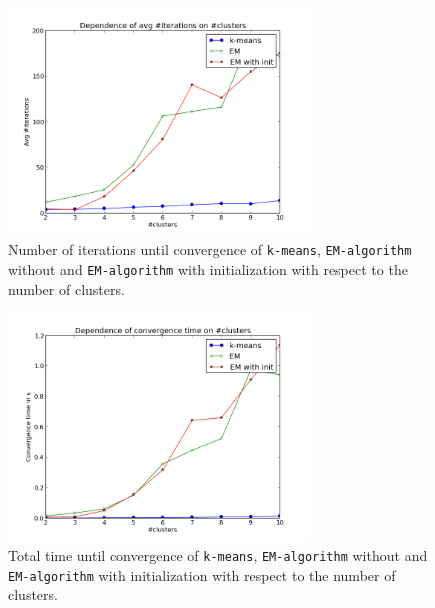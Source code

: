 \documentclass[a4paper, 12pt, titlepage]{article}
\begin{document}
\begin{figure}
	\centering
	\includegraphics[width=8cm]{images/5gaussiansIterations.png}
	\caption{Number of iterations until convergence of \texttt{k-means}, \texttt{EM-algorithm} without and \texttt{EM-algorithm} with initialization with respect to the number of clusters.}
	\label{fig:5gaussiansIterations}
\end{figure}

\begin{figure}
	\centering
	\includegraphics[width=8cm]{images/5gaussiansTime.png}
	\caption{Total time until convergence of \texttt{k-means}, \texttt{EM-algorithm} without and \texttt{EM-algorithm} with initialization with respect to the number of clusters.}
	\label{fig:5gaussiansTime}
\end{figure}
\end{document}
